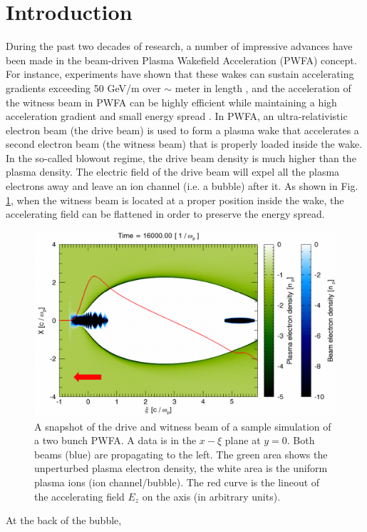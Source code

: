 \documentclass[%
reprint, superscriptaddress,
 amsmath,amssymb, aps,
prstab,
]{revtex4-2}
\begin{document}
%
\maketitle

\section{Introduction} During the past two decades of research, a number of impressive advances have been made in the beam-driven Plasma Wakefield Acceleration (PWFA)  concept. For instance, experiments have shown that these wakes can
sustain accelerating gradients exceeding 50 GeV/m over $\sim$ meter in length
\cite{PWFA2007}, and the acceleration of the witness beam in PWFA
can be highly efficient while maintaining a high acceleration gradient
and small energy spread \cite{PWFA2014}. In PWFA, an ultra-relativistic
electron beam (the drive beam) is used to form a plasma wake 
that accelerates a second electron beam (the witness beam) that is properly loaded inside
the wake. In the so-called blowout regime, the drive beam density is
much higher than the plasma density. The electric field of the drive
beam will expel all the plasma electrons away and leave an
ion channel (i.e. a bubble) after it. As shown in Fig.
\ref{fig:TwoBunches}, when the witness beam is located at a proper
position inside the wake, the accelerating field can be flattened in
order to preserve the energy spread. \begin{figure}[htbp] \centering
\includegraphics[width=0.9\linewidth]{TwoBunches2.png} \caption{A
snapshot of the drive and witness beam of a sample simulation of a two bunch PWFA. A data is in the $x-\xi$ plane at $y=0$.  Both beams (blue) are
propagating to the left. The green area shows the unperturbed plasma electron
density, the white area is the uniform plasma ions (ion channel/bubble).
The red curve is the lineout of the accelerating field $E_z$ on the
axis (in arbitrary units).} \label{fig:TwoBunches} \end{figure} At the back of the bubble,
\end{document}
